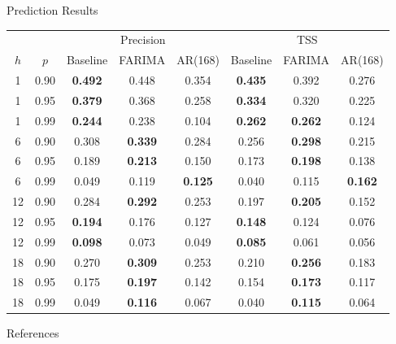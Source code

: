 \documentclass{beamer}
\begin{document}
\begin{frame}{Prediction Results}
    \begin{table}[ht]
    \centering
    \begin{tabular}{cc|ccc|ccc}
      \hline
      & & \multicolumn{3}{c|}{Precision} & \multicolumn{3}{c}{TSS} \\
     $h$ & $p$ & Baseline & FARIMA & AR(168) & Baseline & FARIMA & AR(168) \\
     \hline
     1 & 0.90 & {\bf 0.492} & 0.448 & 0.354 & {\bf 0.435} & 0.392 & 0.276 \\ 
       1 & 0.95 & {\bf 0.379} & 0.368 & 0.258 & {\bf 0.334} & 0.320 & 0.225 \\ 
       1 & 0.99 & {\bf 0.244} & 0.238 & 0.104 & {\bf 0.262} & {\bf 0.262} & 0.124 \\ 
       \hline
     6 & 0.90 & 0.308 & {\bf 0.339} & 0.284 & 0.256 & {\bf 0.298} & 0.215 \\ 
       6 & 0.95 & 0.189 & {\bf 0.213} & 0.150 & 0.173 & {\bf 0.198} & 0.138 \\ 
       6 & 0.99 & 0.049 & 0.119 & {\bf 0.125} & 0.040 & 0.115 & {\bf 0.162} \\ 
       \hline
    12 & 0.90 & 0.284 & {\bf 0.292} & 0.253 & 0.197 & {\bf 0.205} & 0.152 \\ 
      12 & 0.95 & {\bf 0.194} & 0.176 & 0.127 & {\bf 0.148} & 0.124 & 0.076 \\ 
      12 & 0.99 & {\bf 0.098} & 0.073 & 0.049 & {\bf 0.085} & 0.061 & 0.056 \\ 
       \hline
    18 & 0.90 & 0.270 & {\bf 0.309} & 0.253 & 0.210 & {\bf 0.256} & 0.183 \\ 
      18 & 0.95 & 0.175 & {\bf 0.197} & 0.142 & 0.154 & {\bf 0.173} & 0.117 \\ 
      18 & 0.99 & 0.049 & {\bf 0.116} & 0.067 & 0.040 & {\bf 0.115} & 0.064 \\ 
       \hline
    \end{tabular}
    \label{tab:expanded_data_analysis_results}
    \end{table}    
\end{frame}

\begin{frame}[allowframebreaks]{References}
    \printbibliography
\end{frame}
\end{document}
